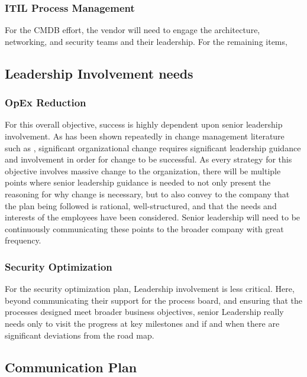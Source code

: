 \documentclass[stu]{apa7}
\begin{document}
\subsubsection{ITIL Process Management}
\label{sec:orgb494bb8}

For the CMDB effort, the vendor will need to engage the architecture, networking, and security teams and their leadership. For the remaining items,

\subsection{Leadership Involvement needs}
\label{sec:org0c0ab79}

\subsubsection{OpEx Reduction}
\label{sec:org6dd977e}

For this overall objective, success is highly dependent upon senior leadership involvement. As has been shown repeatedly in change management literature such as \citet{appelbaumBackFutureRevisiting2012,kotterLeadingChangeNew2012}, significant organizational change requires significant leadership guidance and involvement in order for change to be successful. As every strategy for this objective involves massive change to the organization, there will be multiple points where senior leadership guidance is needed to not only present the reasoning for why change is necessary, but to also convey to the company that the plan being followed is rational, well-structured, and that the needs and interests of the employees have been considered. Senior leadership will need to be continuously communicating these points to the broader company with great frequency.

\subsubsection{Security Optimization}
\label{sec:org5747c0e}

For the security optimization plan, Leadership involvement is less critical. Here, beyond communicating their support for the process board, and ensuring that the processes designed meet broader business objectives, senior Leadership really needs only to visit the progress at key milestones and if and when there are significant deviations from the road map.

\subsection{Communication Plan}
\label{sec:orga5ff14e}
\end{document}
